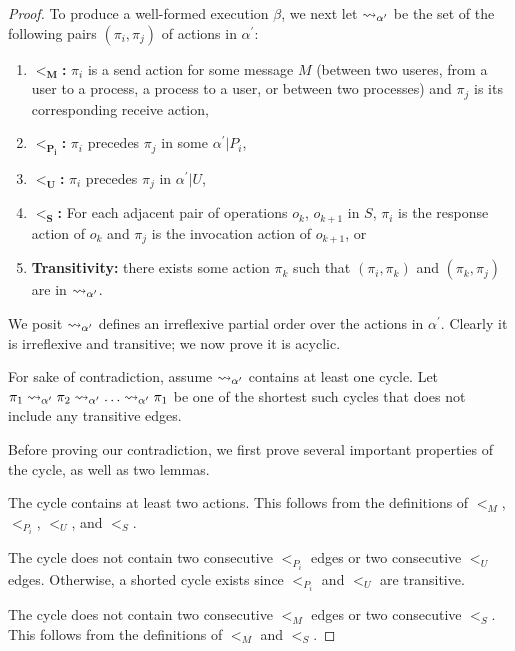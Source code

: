 \begin{proof}
  To produce a well-formed execution $\beta$, we next let $\rightsquigarrow_{\alpha^\prime}$ be the set of the
  following pairs $(\pi_i, \pi_j)$ of actions in $\alpha^\prime$:
  \begin{enumerate}
    \item $\mathbf{<_M}$\textbf{:} $\pi_i$ is a send action for some message $M$ (between two useres,
    from a user to a process, a process to a user, or between two processes) and $\pi_j$
    is its corresponding receive action,
    \item $\mathbf{<_{P_i}}$\textbf{:} $\pi_i$ precedes $\pi_j$ in some $\alpha^\prime | P_i$,
    \item $\mathbf{<_U}$\textbf{:} $\pi_i$ precedes $\pi_j$ in $\alpha^\prime | U$,
    \item $\mathbf{<_S}$\textbf{:} For each adjacent pair of operations $o_k$, $o_{k+1}$ in $S$, $\pi_i$ is
    the response action of $o_k$ and $\pi_j$ is the invocation action of $o_{k+1}$, or
    \item \textbf{Transitivity:} there exists some action $\pi_k$ such that $(\pi_i, \pi_k)$
    and $(\pi_k, \pi_j)$ are in $\rightsquigarrow_{\alpha^\prime}$.
  \end{enumerate}

  We posit $\rightsquigarrow_{\alpha^\prime}$ defines an irreflexive partial order over the actions
  in $\alpha^\prime$. Clearly it is irreflexive and transitive; we now prove it is acyclic.

  For sake of contradiction, assume $\rightsquigarrow_{\alpha^\prime}$ contains at least one cycle. Let
  $\pi_1 \rightsquigarrow_{\alpha^\prime} \pi_2 \rightsquigarrow_{\alpha^\prime} \ldots \rightsquigarrow_{\alpha^\prime} \pi_1$
  be one of the shortest such cycles that does not include any transitive edges.

  Before proving our contradiction, we first prove several important properties of the cycle,
  as well as two lemmas.

   The cycle contains at least two actions.
  This follows from the definitions of $<_M$, $<_{P_i}$, $<_U$, and $<_S$.

   The cycle does not contain two consecutive
  $<_{P_i}$ edges or two consecutive $<_U$ edges. Otherwise, a shorted cycle
  exists since $<_{P_i}$ and $<_U$ are transitive.

   The cycle does not contain two consecutive
  $<_M$ edges or two consecutive $<_S$. This follows from the definitions of
  $<_M$ and $<_S$.


\end{proof}
